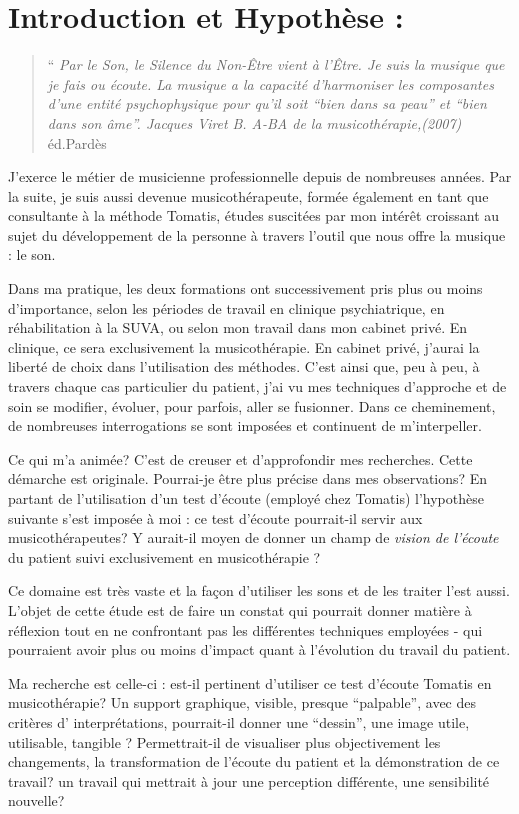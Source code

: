 \documentclass[12pt,french]{report}
\makeatletter
\let\SF@@footnote\footnote
\def\footnote{\ifx\protect\@typeset@protect
    \expandafter\SF@@footnote
  \else
    \expandafter\SF@gobble@opt
  \fi
}
\edef\SF@gobble@opt{\noexpand\protect
  \expandafter\noexpand\csname SF@gobble@opt \endcsname}
\makeatother
\begin{document}
\chapter{Introduction et Hypothèse : }
\begin{quotation}
``\emph{ Par le Son, le Silence du Non-Être vient à l'Être. Je suis
la musique que je fais ou écoute. La musique a la capacité d'harmoniser
les composantes d'une entité psychophysique pour qu'il soit ``bien
dans sa peau'' et ``bien dans son âme''. Jacques Viret }\footnote{\emph{B. A-BA de la musicothérapie,(2007)} éd.Pardès}
\end{quotation}
J'exerce le métier de musicienne professionnelle depuis de nombreuses
années. Par la suite, je suis aussi devenue musicothérapeute, formée
également en tant que consultante à la méthode Tomatis, études suscitées
par mon intérêt croissant au sujet du développement de la personne
à travers l'outil que nous offre la musique : le son.

Dans ma pratique, les deux formations ont successivement pris plus
ou moins d'importance, selon les périodes de travail en clinique psychiatrique,
en réhabilitation à la SUVA, ou selon mon travail dans mon cabinet
privé. En clinique, ce sera exclusivement la musicothérapie. En cabinet
privé, j'aurai la liberté de choix dans l'utilisation des méthodes.
C'est ainsi que, peu à peu, à travers chaque cas particulier du patient,
j'ai vu mes techniques d'approche et de soin se modifier, évoluer,
pour parfois, aller se fusionner. Dans ce cheminement, de nombreuses
interrogations se sont imposées et continuent de m'interpeller.

Ce qui m'a animée? C'est de creuser et d'approfondir mes recherches.
Cette démarche est originale. Pourrai-je être plus précise dans mes
observations? En partant de l'utilisation d'un test d'écoute (employé
chez Tomatis) l'hypothèse suivante s'est imposée à moi : ce test d'écoute
pourrait-il servir aux musicothérapeutes? Y aurait-il moyen de donner
un champ de \emph{vision de l'écoute }du patient suivi exclusivement
en musicothérapie ?

Ce domaine est très vaste et la façon d'utiliser les sons et de les
traiter l'est aussi. L'objet de cette étude est de faire un constat
qui pourrait donner matière à réflexion tout en ne confrontant pas
les différentes techniques employées - qui pourraient avoir plus ou
moins d'impact quant à l'évolution du travail du patient.

Ma recherche est celle-ci : est-il pertinent d'utiliser ce test d'écoute
Tomatis en musicothérapie? Un support graphique, visible, presque
``palpable'', avec des critères d' interprétations, pourrait-il
donner une ``dessin'', une image utile, utilisable, tangible ? Permettrait-il
de visualiser plus objectivement les changements, la transformation
de l'écoute du patient et la démonstration de ce travail? un travail
qui mettrait à jour une perception différente, une sensibilité nouvelle?
\end{document}
